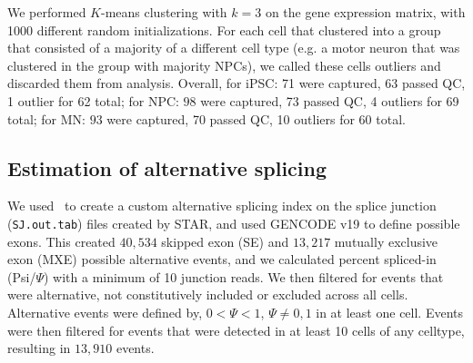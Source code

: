 We performed $K$-means clustering with $k=3$ on the gene expression matrix, with 1000 different random initializations. For each cell that clustered into a group that consisted of a majority of a different cell type (e.g. a motor neuron that was clustered in the group with majority NPCs), we called these cells outliers and discarded them from analysis. Overall, for iPSC: 71 were captured, 63 passed  QC,  1 outlier for 62 total; for NPC: $98$ were captured, 73 passed QC, 4 outliers for 69 total; for MN: $93$ were captured,  70 passed QC, 10 outliers for 60 total.



\subsection{Estimation of alternative splicing}
We used \outrigger\, to create a custom alternative splicing index on the splice junction (\texttt{SJ.out.tab}) files created by STAR, and used GENCODE v19 to define possible exons. This created $40,534$ skipped exon (SE) and $13,217$ mutually exclusive exon (MXE) possible alternative events, and we calculated percent spliced-in (Psi/$\Psi$) with a minimum of 10 junction reads. We then filtered for events that were alternative, not constitutively included or excluded across all cells. Alternative events were defined by, $0 < \Psi < 1$, $\Psi \neq 0, 1$ in at least one cell. Events were then filtered for events that were detected in at least 10 cells of any celltype, resulting in $13,910$ events.



